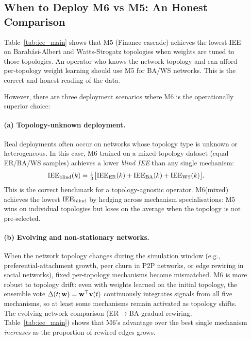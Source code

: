 
\subsection{When to Deploy M6 vs M5: An Honest Comparison}
\label{sec:m6_vs_m5}

Table~\ref{tab:iee_main} shows that M5 (Finance cascade) achieves the
lowest IEE on Barab\'asi-Albert and Watts-Strogatz topologies when weights
are tuned to those topologies.  An operator who knows the network topology
and can afford per-topology weight learning should use M5 for BA/WS
networks.  This is the correct and honest reading of the data.

However, there are three deployment scenarios where M6 is the
operationally superior choice:

\paragraph{(a) Topology-unknown deployment.}
Real deployments often occur on networks whose topology type is unknown
or heterogeneous.  In this case, M6 trained on a mixed-topology dataset
(equal ER/BA/WS samples) achieves a lower \emph{blind IEE} than any single
mechanism:
\begin{equation}
  \mathrm{IEE}_{\mathrm{blind}}(k)
  = \tfrac{1}{3}\bigl[\mathrm{IEE}_{\mathrm{ER}}(k)
                      + \mathrm{IEE}_{\mathrm{BA}}(k)
                      + \mathrm{IEE}_{\mathrm{WS}}(k)\bigr].
  \label{eq:blind_iee}
\end{equation}
This is the correct benchmark for a topology-agnostic operator.
M6(mixed) achieves the lowest $\mathrm{IEE}_{\mathrm{blind}}$ by hedging across
mechanism specialisations: M5 wins on individual topologies but loses on
the average when the topology is not pre-selected.

\paragraph{(b) Evolving and non-stationary networks.}
When the network topology changes during the simulation window (e.g.,
preferential-attachment growth, peer churn in P2P networks, or edge rewiring
in social networks), fixed per-topology mechanisms become mismatched.
M6 is more robust to topology drift: even with weights learned on the initial
topology, the ensemble vote $\Delta(t;\mathbf{w}) = \mathbf{w}^\top\mathbf{v}(t)$ continuously
integrates signals from all five mechanisms, so at least some mechanisms
remain activated as topology shifts.  The evolving-network comparison
(ER$\to$BA gradual rewiring, Table~\ref{tab:iee_main}) shows
that M6's advantage over the best single mechanism \emph{increases} as
the proportion of rewired edges grows.

